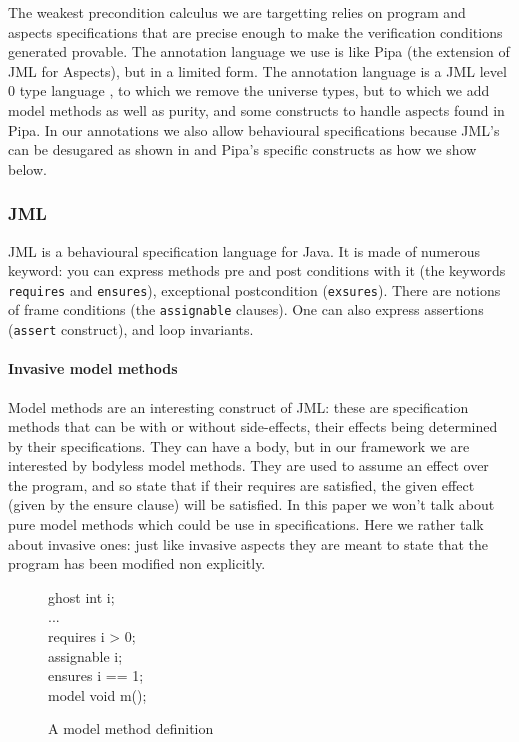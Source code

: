 The weakest precondition calculus we are targetting relies on program and aspects specifications that are
precise enough to make the verification conditions generated provable.
The annotation language we use is like Pipa \cite{ZhaoR03} (the extension
of JML for Aspects), but in a limited form. The annotation language is a JML level 0 type language 
\cite{Leavens-etal07}, to which
we remove the universe types, but to which we add model methods as well as purity, and some constructs
to handle aspects found in Pipa. In our annotations we also allow behavioural specifications
because JML's can be desugared as shown in \cite{RaghavanL00} and Pipa's specific constructs
 as how we show below.

\subsubsection{JML} JML is a behavioural specification language for Java. It is made of numerous keyword: you 
can express methods pre and post conditions with it (the keywords {\tt requires} and {\tt ensures}), exceptional
postcondition ({\tt exsures}). There
are notions of frame conditions (the {\tt assignable} clauses). One can also express assertions ({\tt assert} 
construct), and loop invariants.

\paragraph{Invasive model methods} 
Model methods are an interesting construct of JML: these are specification
methods that can be with or without side-effects, their effects being determined by their specifications.
They can have a body, but in our framework we are interested by bodyless model methods. They are used to 
assume an effect over the program, and so state that if their requires are satisfied, the given effect (given by
the ensure clause) will be satisfied.
In this paper we won't talk about pure model methods which could be use in specifications. Here we rather talk
about invasive ones: just like invasive aspects they are meant to state that the program has been modified 
non explicitly.
\begin{figure}
\begin{center}\begin{minipage}{3cm}
\bcode
ghost int i;\\
...\\
requires i > 0;\\
assignable i;\\
ensures i == 1;\\
model void m();
\ecode
\end{minipage}\end{center}
\caption{A model method definition}
\label{model_meth_def}
\end{figure}


